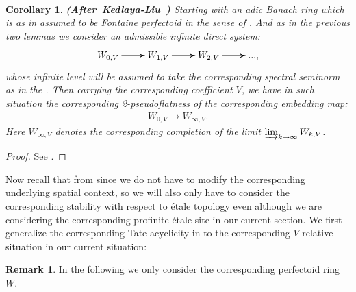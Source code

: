 \documentclass[12pt]{amsart}
\newtheorem{corollary}[theorem]{Corollary}
\theoremstyle{definition}
\newtheorem{remark}[theorem]{Remark}
\numberwithin{equation}{section}
\begin{document}
\



\begin{corollary}\mbox{\bf{(After Kedlaya-Liu \cite[Corollary 3.4.5]{KL2})}} 
Starting with an adic Banach ring which is as in \cite[Corollary 3.4.5]{KL2} assumed to be Fontaine perfectoid in the sense of \cite[Definition 3.3.1]{KL2}. And as in the previous two lemmas we consider an admissible infinite direct system:
\[
\xymatrix@C+0pc@R+0pc{
W_{0,V} \ar[r] \ar[r] \ar[r] &W_{1,V} \ar[r] \ar[r] \ar[r] &W_{2,V}  \ar[r] \ar[r] \ar[r] &...,   
}
\]
whose infinite level will be assumed to take the corresponding spectral seminorm as in the \cite[Corollary 3.4.5]{KL2}. Then carrying the corresponding coefficient $V$, we have in such situation the corresponding 2-pseudoflatness of the corresponding embedding map:
\begin{align}
W_{0,V}\rightarrow W_{\infty,V}.
\end{align}
Here $W_{\infty,V}$ denotes the corresponding completion of the limit $\varinjlim_{k\rightarrow\infty}W_{k,V}$.
\end{corollary}


\begin{proof}
See \cite[Corollary 3.4.5]{KL2}.	
\end{proof}





\indent Now recall that from \cite{KL2} since we do not have to modify the corresponding underlying spatial context, so we will also only have to consider the corresponding stability with respect to \'etale topology even although we are considering the corresponding profinite \'etale site in our current section. We first generalize the corresponding Tate acyclicity in \cite{KL2} to the corresponding $V$-relative situation in our current situation:




\begin{remark}
In the following we only consider the corresponding perfectoid ring $W$.	
\end{remark}
\end{document}
